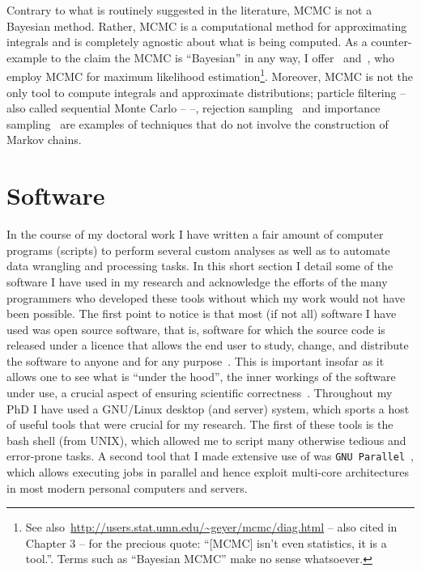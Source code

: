 Contrary to what is routinely suggested in the literature, MCMC is not a Bayesian method.
Rather, MCMC is a computational method for approximating integrals and is completely agnostic about what is being computed.
As a counter-example to the claim the MCMC is ``Bayesian'' in any way, I offer~\cite{Geyer1991} and~\cite{Kuhner1998}, who employ MCMC for maximum likelihood estimation\footnote{See also~\url{http://users.stat.umn.edu/~geyer/mcmc/diag.html} -- also cited in Chapter 3 -- for the precious quote: ``[MCMC] isn't even statistics, it is a tool.''. Terms such as ``Bayesian MCMC'' make no sense whatsoever. }.
Moreover, MCMC is not the only tool to compute integrals and approximate distributions; particle filtering -- also called sequential Monte Carlo --\citep{Gordon1993, DelMoral1996} --, rejection sampling~\citep{Casella2004} and importance sampling~\citep{Rubinstein2016} are examples of techniques that do not involve the construction of Markov chains.

\section{Software}
\label{sec:software}

In the course of my doctoral work I have written a fair amount of computer programs (scripts) to perform several custom analyses as well as to automate data wrangling and processing tasks.
In this short section I detail some of the software I have used in my research and acknowledge the efforts of the many programmers who developed these tools without which my work would not have been possible.
The first point to notice is that most (if not all) software I have used was open source software, that is, software for which the source code is released under a licence that allows the end user to study, change, and distribute the software to anyone and for any purpose~\citep{Laurent2004}.
This is important insofar as it allows one to see what is ``under the hood'', the inner workings of the software under use, a crucial aspect of ensuring scientific correctness~\citep{Darriba2018}.
Throughout my PhD I have used a GNU/Linux desktop (and server) system, which sports a host of useful tools that were crucial for my research.
The first of these tools is the bash shell (from UNIX), which allowed me to script many otherwise tedious and error-prone tasks.
A second tool that I made extensive use of was \verb|GNU Parallel|~\citep{Tange2011}, which allows executing jobs in parallel and hence exploit multi-core architectures in most modern personal computers and servers.

